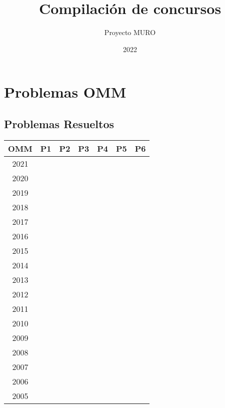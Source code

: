 \documentclass[11pt]{scrartcl}
\begin{document}
\title{Compilación de concursos}
\author{Proyecto MURO}
\date{2022}
\maketitle

\hypertarget{tabla}{\tableofcontents}
\vfill
\eject

\section{Problemas OMM}

    \subsection*{Problemas Resueltos}
    \begin{center} 
        \begin{tabular}{| c | c | c | c | c | c | c |}
            \hline
            OMM & P1 & P2 & P3 & P4 & P5 & P6 \\
            \hline
            2021 & & & & & & \\
            \hline
            2020 & & & & & & \\
            \hline
            2019 & & & & & & \\
            \hline
            2018 & & & & & & \\
            \hline
            2017 & & & & & & \\
            \hline
            2016 & & & & & & \\
            \hline
            2015 & & & & & & \\
            \hline
            2014 & & & & & & \\
            \hline
            2013 & & & & & & \\
            \hline
            2012 & & & & & & \\
            \hline
            2011 & & & & & & \\
            \hline
            2010 & & & & & & \\
            \hline
            2009 & & & & & & \\
            \hline
            2008 & & & & & & \\
            \hline
            2007 & & & & & & \\
            \hline
            2006 & & & & & & \\
            \hline
            2005 & & & & & & \\

\end{tabular}
\end{center}
\end{document}
